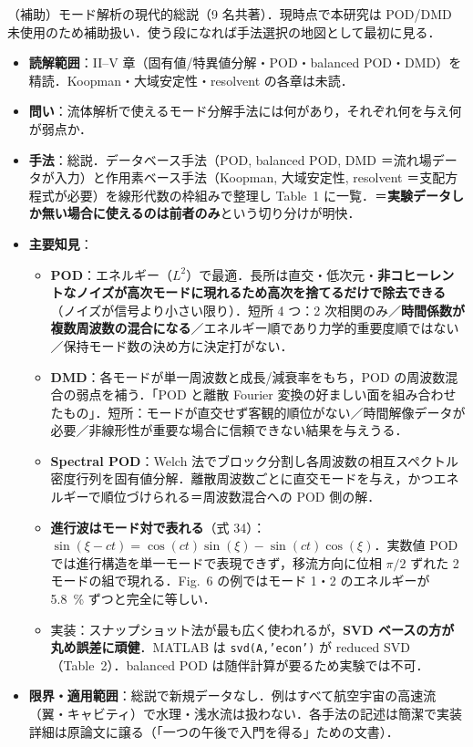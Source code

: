 \documentclass[11pt]{jsarticle}
\newcommand{\litref}[1]{{\large\bfseries\color{citecolor}#1}}
\begin{document}
\noindent\litref{Taira et al. (2017)}\quad（補助）モード解析の現代的総説（9 名共著）．現時点で本研究は POD/DMD 未使用のため補助扱い．使う段になれば手法選択の地図として最初に見る．
\begin{itemize}
  \item \textbf{読解範囲}：II--V 章（固有値/特異値分解・POD・balanced POD・DMD）を精読．Koopman・大域安定性・resolvent の各章は未読．
  \item \textbf{問い}：流体解析で使えるモード分解手法には何があり，それぞれ何を与え何が弱点か．
  \item \textbf{手法}：総説．データベース手法（POD, balanced POD, DMD ＝流れ場データが入力）と作用素ベース手法（Koopman, 大域安定性, resolvent ＝支配方程式が必要）を線形代数の枠組みで整理し Table~1 に一覧．＝\textbf{実験データしか無い場合に使えるのは前者のみ}という切り分けが明快．
  \item \textbf{主要知見}：
  \begin{itemize}
    \item \textbf{POD}：エネルギー（$L^2$）で最適．長所は直交・低次元・\textbf{非コヒーレントなノイズが高次モードに現れるため高次を捨てるだけで除去できる}（ノイズが信号より小さい限り）．短所 4 つ：2 次相関のみ／\textbf{時間係数が複数周波数の混合になる}／エネルギー順であり力学的重要度順ではない／保持モード数の決め方に決定打がない．
    \item \textbf{DMD}：各モードが単一周波数と成長/減衰率をもち，POD の周波数混合の弱点を補う．「POD と離散 Fourier 変換の好ましい面を組み合わせたもの」．短所：モードが直交せず客観的順位がない／時間解像データが必要／非線形性が重要な場合に信頼できない結果を与えうる．
    \item \textbf{Spectral POD}：Welch 法でブロック分割し各周波数の相互スペクトル密度行列を固有値分解．離散周波数ごとに直交モードを与え，かつエネルギーで順位づけられる＝周波数混合への POD 側の解．
    \item \textbf{進行波はモード対で表れる}（式 34）：$\sin(\xi - ct) = \cos(ct)\sin(\xi) - \sin(ct)\cos(\xi)$．実数値 POD では進行構造を単一モードで表現できず，移流方向に位相 $\pi/2$ ずれた 2 モードの組で現れる．Fig.~6 の例ではモード 1・2 のエネルギーが 5.8~\% ずつと完全に等しい．
    \item 実装：スナップショット法が最も広く使われるが，\textbf{SVD ベースの方が丸め誤差に頑健}．MATLAB は \texttt{svd(A,'econ')} が reduced SVD（Table~2）．balanced POD は随伴計算が要るため実験では不可．
  \end{itemize}
  \item \textbf{限界・適用範囲}：総説で新規データなし．例はすべて航空宇宙の高速流（翼・キャビティ）で水理・浅水流は扱わない．各手法の記述は簡潔で実装詳細は原論文に譲る（「一つの午後で入門を得る」ための文書）．

\end{itemize}
\end{document}
